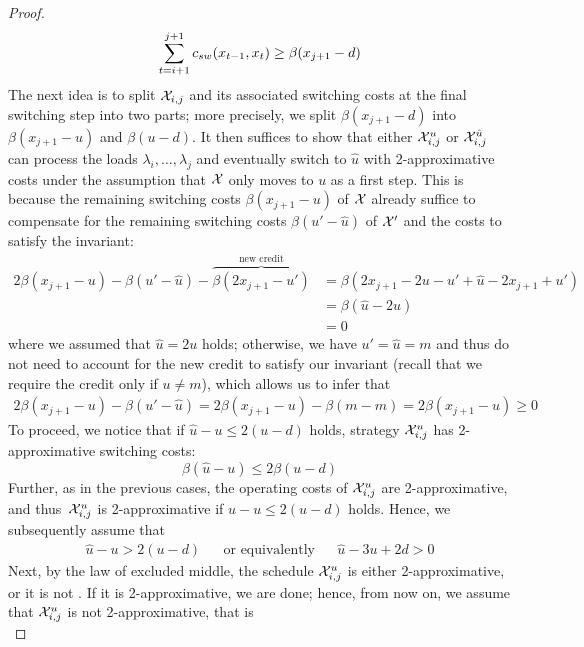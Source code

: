 \begin{proof}
\begin{equation*}
	\sum\limits_{t=i+1}^{j+1}c_{sw}(x_{t-1},x_t)\ge\beta(x_{j+1}-d)
\end{equation*}
The next idea is to split $\mathcal{X}_{i,j}$ and its associated switching costs at the final switching step into two parts; more precisely, we split $\beta(x_{j+1}-d)$ into $\beta(x_{j+1}-u)$ and $\beta(u-d)$. It then suffices to show that either $\mathcal{X}_{i,j}^u$ or $\mathcal{X}_{i,j}^{\hat{u}}$ can process the loads $\lambda_i,\dotsc,\lambda_j$ and eventually switch to $\hat{u}$ with 2-approximative costs under the assumption that $\mathcal{X}$ only moves to $u$ as a first step. This is because the remaining switching costs $\beta(x_{j+1}-u)$ of $\mathcal{X}$ already suffice to compensate for the remaining switching costs $\beta(u'-\hat{u})$ of $\mathcal{X}'$ and the costs to satisfy the invariant:
\begin{align*}
	2\beta(x_{j+1}-u)-\beta(u'-\hat{u})-\overbrace{\beta(2x_{j+1}-u')}^{\text{new credit}}&=\beta(2x_{j+1}-2u-u'+\hat{u}-2x_{j+1}+u')\\
	&=\beta(\hat{u}-2u)\\
	&=0
\end{align*}
where we assumed that $\hat{u}=2u$ holds; otherwise, we have $u'=\hat{u}=m$ and thus do not need to account for the new credit to satisfy our invariant (recall that we require the credit only if $u\neq m$), which allows us to infer that
\begin{align*}
	2\beta(x_{j+1}-u)-\beta(u'-\hat{u})=2\beta(x_{j+1}-u)-\beta(m-m)=2\beta(x_{j+1}-u)\ge 0
\end{align*}
To proceed, we notice that if $\hat{u}-u\le2(u-d)$ holds, strategy $\mathcal{X}_{i,j}^u$ has 2-approximative switching costs:
\begin{equation*}
	\beta(\hat{u}-u)\le2\beta(u-d)
\end{equation*}
Further, as in the previous cases, the operating costs of $\mathcal{X}_{i,j}^u$ are 2-approximative, and thus~$\mathcal{X}_{i,j}^u$ is 2-approximative if $\hat{u}-u\le2(u-d)$ holds. Hence, we subsequently assume that 
\begin{align}\label{eq:proof_2_approximative_asm_dist_pos}
	\hat{u}-u>2(u-d)&&\text{or equivalently}&&\hat{u}-3u+2d>0
\end{align}
Next, by the law of excluded middle, the schedule $\mathcal{X}_{i,j}^u$ is either 2-approximative, or it is not . If it is 2-approximative, we are done; hence, from now on, we assume that $\mathcal{X}_{i,j}^u$ is not 2-approximative, that is
\begin{equation*}

\end{equation*}
\end{proof}
